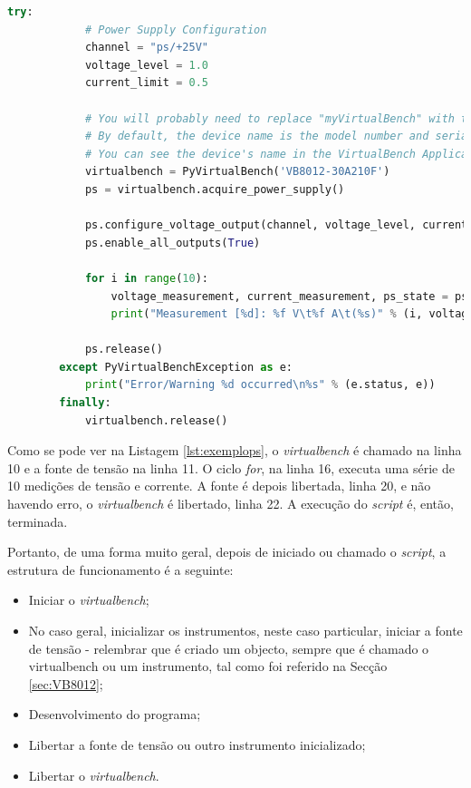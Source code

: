 \begin{minipage}{0.9\linewidth}
	\begin{lstlisting}[language=Python, caption=Exemplo \textit{ps\_example.py}, label=lst:exemplops]
		try:
			# Power Supply Configuration
			channel = "ps/+25V"
			voltage_level = 1.0
			current_limit = 0.5

			# You will probably need to replace "myVirtualBench" with the name of your device.
			# By default, the device name is the model number and serial number separated by a hyphen; e.g., "VB8012-309738A".
			# You can see the device's name in the VirtualBench Application under File->About
			virtualbench = PyVirtualBench('VB8012-30A210F')
			ps = virtualbench.acquire_power_supply()

			ps.configure_voltage_output(channel, voltage_level, current_limit)
			ps.enable_all_outputs(True)

			for i in range(10):
				voltage_measurement, current_measurement, ps_state = ps.read_output(channel)
				print("Measurement [%d]: %f V\t%f A\t(%s)" % (i, voltage_measurement, current_measurement, str(ps_state)))

			ps.release()
		except PyVirtualBenchException as e:
    		print("Error/Warning %d occurred\n%s" % (e.status, e))
		finally:
    		virtualbench.release()

	\end{lstlisting}
\end{minipage}

Como se pode ver na Listagem \ref{lst:exemplops}, o \textit{virtualbench} é chamado na linha 10 e a fonte de tensão na linha 11. O ciclo \textit{for}, na linha 16, executa uma série de 10 medições de tensão e corrente. A fonte é depois libertada, linha 20, e não havendo erro, o \textit{virtualbench} é libertado, linha 22. A execução do \textit{script} é, então, terminada.

Portanto, de uma forma muito geral, depois de iniciado ou chamado o \textit{script}, a estrutura de funcionamento é a seguinte:
\begin{itemize}
	\item Iniciar o \textit{virtualbench};
	\item No caso geral, inicializar os instrumentos, neste caso particular, iniciar a fonte de tensão - relembrar que é criado um objecto, sempre que é chamado o \acrshort{virtualbench} ou um instrumento, tal como foi referido na Secção \ref{sec:VB8012};
	\item Desenvolvimento do programa;
	\item Libertar a fonte de tensão ou outro instrumento inicializado;
	\item Libertar o \textit{virtualbench}.
\end{itemize}

